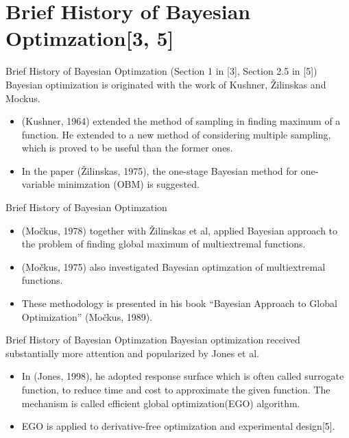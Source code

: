 \documentclass{beamer}
\begin{document}
\section{Brief History of Bayesian Optimzation[3, 5]}

%
\begin{frame}{Brief History of Bayesian Optimzation}
(Section 1 in [3], Section 2.5 in [5])\\[20pt]
Bayesian optimization is originated with the work of \alert{Kushner}, \alert{Žilinskas} and \alert{Mockus}.
\begin{itemize}
\item
(Kushner, 1964) extended the method of sampling in finding maximum of a function.
He extended to a new method of considering multiple sampling, which is proved to be useful than the former ones.
\item
In the paper (Žilinskas, 1975), the one-stage Bayesian method for one-variable minimzation (OBM) is suggested.
\end{itemize}
\end{frame}

%
\begin{frame}{Brief History of Bayesian Optimzation}
\begin{itemize}
\item
(Močkus, 1978) together with Žilinskas et al, applied Bayesian approach to the problem of finding global maximum of multiextremal functions.
\item
(Močkus, 1975) also investigated Bayesian optimzation of multiextremal functions.
\item
These methodology is presented in his book ``Bayesian Approach to Global Optimization'' (Močkus, 1989).
\end{itemize}
\end{frame}

%
\begin{frame}{Brief History of Bayesian Optimzation}
Bayesian optimization received substantially more attention and popularized by Jones et al.
\begin{itemize}
\item
In (Jones, 1998), he adopted response surface which is often called \alert{surrogate function}, to reduce time and cost to approximate the given function.
The mechanism is called \alert{efficient global optimization}(EGO) algorithm.
\item
EGO is applied to derivative-free optimization and experimental design[5].
\end{itemize}
\end{frame}
\end{document}
